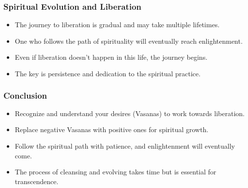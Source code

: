 \begin{frame}\frametitle{Spiritual Evolution and Liberation}
  \begin{itemize}
    \item The journey to liberation is gradual and may take multiple lifetimes.
    \item One who follows the path of spirituality will eventually reach enlightenment.
    \item Even if liberation doesn’t happen in this life, the journey begins.
    \item The key is persistence and dedication to the spiritual practice.
  \end{itemize}
\end{frame}

\begin{frame}\frametitle{Conclusion}
  \begin{itemize}
    \item Recognize and understand your desires (Vasanas) to work towards liberation.
    \item Replace negative Vasanas with positive ones for spiritual growth.
    \item Follow the spiritual path with patience, and enlightenment will eventually come.
    \item The process of cleansing and evolving takes time but is essential for transcendence.
  \end{itemize}
\end{frame}
